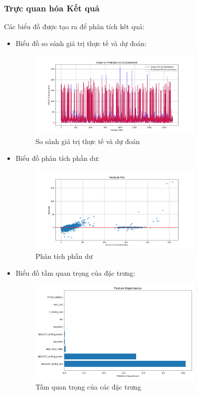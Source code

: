 \subsubsection{Trực quan hóa Kết quả}
Các biểu đồ được tạo ra để phân tích kết quả:
\begin{itemize}
    \item Biểu đồ so sánh giá trị thực tế và dự đoán:
    \begin{figure}[h]
        \centering
        \includegraphics[width=0.8\textwidth]{images/random_forest/predictions_comparison.png}
        \caption{So sánh giá trị thực tế và dự đoán}
        \label{fig:predictions}
    \end{figure}
    
    \item Biểu đồ phân tích phần dư:
    \begin{figure}[h]
        \centering
        \includegraphics[width=0.8\textwidth]{images/random_forest/residuals_plot.png}
        \caption{Phân tích phần dư}
        \label{fig:residuals}
    \end{figure}
    
    \item Biểu đồ tầm quan trọng của đặc trưng:
    \begin{figure}[h]
        \centering
        \includegraphics[width=0.8\textwidth]{images/random_forest/feature_importance.png}
        \caption{Tầm quan trọng của các đặc trưng}
        \label{fig:importance}
    \end{figure}
\end{itemize}

